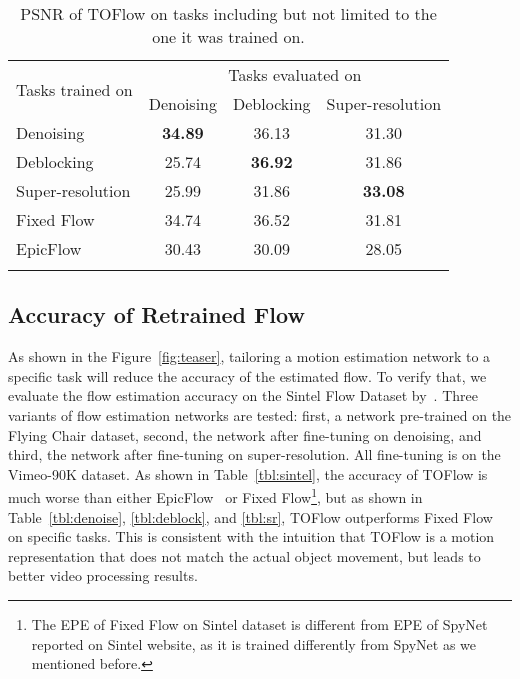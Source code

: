 \documentclass[twocolumn,natbib]{svjour3}          \smartqed  \usepackage{graphicx}
\newcommand{\fig}[1]{Figure~\ref{#1}}
\newcommand{\tbl}[1]{Table~\ref{#1}}
\def\data{Vimeo-90K\xspace}
\def\toflow{TOFlow\xspace}
\def\fflow{Fixed Flow\xspace}
\def\epicflow{EpicFlow\xspace}
\begin{document}
\begin{table}[t]
\centering
\small
\begin{tabular}{lccc}
    \toprule
    \multirow{2}{*}{Tasks trained on} & \multicolumn{3}{c}{Tasks evaluated on} \\
    \cmidrule{2-4}
    & Denoising & Deblocking & Super-resolution \\
    \midrule
    Denoising & \textbf{34.89} & 36.13 & 31.30 \\
    Deblocking & 25.74 & \textbf{36.92} & 31.86 \\
    Super-resolution & 25.99 & 31.86 & \textbf{33.08} \\
    \midrule
    \fflow & 34.74 & 36.52 & 31.81 \\
    \epicflow & 30.43 & 30.09 & 28.05 \\
    \bottomrule
\normalsize
\end{tabular}
\vspace{-7pt}
\caption{PSNR of \toflow on tasks including but not limited to the one it was trained on.}
\label{tbl:switch_flow}
\end{table}
 
\subsection{Accuracy of Retrained Flow}

As shown in the \fig{fig:teaser}, tailoring a motion estimation network to a specific task will reduce the accuracy of the estimated flow. To verify that, we evaluate the flow estimation accuracy on the Sintel Flow Dataset by~\cite{Butler2012naturalistic}. Three variants of flow estimation networks are tested: first, a network pre-trained on the Flying Chair dataset, second, the network after fine-tuning on denoising, and third, the network after fine-tuning on super-resolution. All fine-tuning is on the \data dataset. As shown in \tbl{tbl:sintel}, the accuracy of \toflow is much worse than either \epicflow~\citep{Revaud2015Epicflow} or \fflow\footnote{The EPE of \fflow on Sintel dataset is different from EPE of SpyNet~\citep{Ranjan2017Optical} reported on Sintel website, as it is trained differently from SpyNet as we mentioned before.}, but as shown in \tbl{tbl:denoise}, \ref{tbl:deblock}, and \ref{tbl:sr}, \toflow outperforms \fflow on specific tasks. This is consistent with the intuition that \toflow is a motion representation that does not match the actual object movement, but leads to better video processing results.
\end{document}
